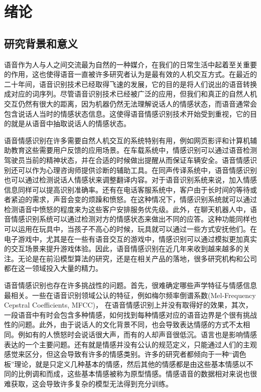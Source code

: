 \chapter{绪论}
\label{cha:intro}

\section{研究背景和意义}
\label{sec:background}
语音作为人与人之间交流最为自然的一种媒介，在我们的日常生活中起着至关重要的作用，这也使得语音一直被许多研究者认为是最有效的人机交互方式。在最近的二十年间，语音识别技术已经取得飞速的发展，它的目的是将人们说出的语音转换成对应的词序列。尽管语音识别技术已经被广泛的应用，但我们和真正的自然人机交互仍然有很大的距离，因为机器仍然无法理解说话人的情感状态，而语音通常会包含说话人当时的情感状态信息。这使得语音情感识别技术开始受到重视，它的目的就是从语音中抽取说话人的情感状态。

语音情感识别在许多需要自然人机交互的系统特别有用，例如网页影评和计算机辅助教育这些需要用户反馈的应用场景。在车载系统中，情感识别可以通过语音检测驾驶员当前的精神状态，并在合适的时候做出提醒从而保证车辆安全。语音情感识别还可以作为心理咨询师提供诊断的辅助工具。在同声传译系统中，语音情感识别也可以通过检测说话人情感状来调整翻译内容。对于语音识别系统来说，加入情感信息同样可以提高识别准确率。还有在电话客服系统中，客户由于长时间的等待或者紧迫的需求，声音会变的烦躁和愤怒。在这种情况下，情感识别系统就可以通过检测语音中愤怒的程度来为这些客户安排服务优先级。此外，在聊天机器人中，语音情感识别系统可以通过检测对方的情感状态来做出不同的应答。这种功能同样也可以运用在玩具中，当孩子不高心的时候，玩具就可以通过一些方式安抚他们。在电子游戏中，尤其是在一些有语音交互的游戏中，情感识别可以通过模拟更加真实的交互场景来提升游戏体验。因此，语音情感识别在近几年来收到越来越多的关注。无论是在前沿模型算法的研究，还是在相关产品的落地，很多研究机构和公司都在这一领域投入大量的精力。

语音情感识别也存在许多挑战性的问题。首先，很难确定哪些声学特征与情感信息最相关。一些在语音识别领域公认的特征，例如梅尔频率倒谱系数(Mel-Frequency Cepstral Coefficients, MFCC)， 在语音情感识别上并没有取得好的效果，其次，一段语音中有时会包含多种情感，如何找到每种情感对应的语音边界是个很有挑战性的问题。此外，由于说话人的文化背景不同，也会导致表达情感的方式不太相同。例如有的人愤怒时会说话很大声，而有的人却声音很低沉。语言也是影响情感表达的一个主要问题。还有就是情感并没有公认的规范定义，只能通过人们的主观感觉来区分，但这会导致有许多的情感类别。许多的研究者都倾向于一种“调色板”理论，就是只定义几种基本的情感，然后其他的情感都是由这些基本情感以不同的比例调和而成，这些基本情感被称为原型情感。情感语音的数据相对来说也很难获取，这会导致许多复杂的模型无法得到充分训练。

